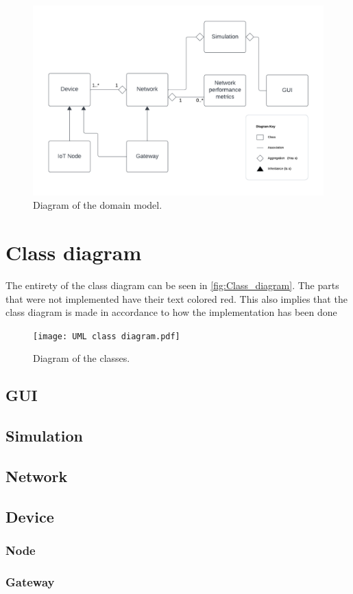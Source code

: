 \begin{figure}[H]
  \centering
  \includegraphics[width=\textwidth]{Domain_model.pdf}
  \caption{Diagram of the domain model.}
  \label{fig:Domain_model}
\end{figure}

\section{Class diagram}
The entirety of the class diagram can be seen in \autoref{fig:Class_diagram}. The parts that were not implemented have their text colored red. This also implies that the class diagram is made in accordance to how the implementation has been done

\begin{figure}[H]
  \centering
  \texttt{[image: UML class diagram.pdf]}
  \caption{Diagram of the classes.}
  \label{fig:Class_diagram}
\end{figure}


\subsection{GUI}


\subsection{Simulation}


\subsection{Network}


\subsection{Device}


\subsubsection{Node}


\subsubsection{Gateway}




